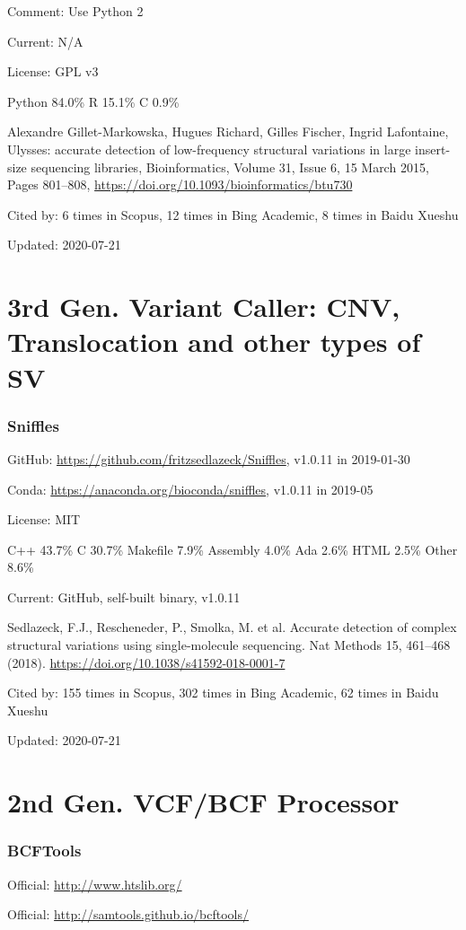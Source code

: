 \documentclass[]{article}
\newcommand{\cb}[3]{\par Cited by: {\color{blue}\Huge #1} times in Scopus, {\color{blue}\Huge #2} times in Bing Academic, {\color{blue}\Huge #3} times in Baidu Xueshu}
\begin{document}
Comment: Use Python 2

Current: N/A

License: GPL v3

Python 84.0\% R 15.1\% C 0.9\%

Alexandre Gillet-Markowska, Hugues Richard, Gilles Fischer, Ingrid Lafontaine, Ulysses: accurate detection of low-frequency structural variations in large insert-size sequencing libraries, Bioinformatics, Volume 31, Issue 6, 15 March 2015, Pages 801–808, \url{https://doi.org/10.1093/bioinformatics/btu730}\cb{6}{12}{8}

Updated: 2020-07-21

\part{3rd Gen. Variant Caller: CNV, Translocation and other types of SV}

\section{Sniffles}

GitHub: \url{https://github.com/fritzsedlazeck/Sniffles}, v1.0.11 in 2019-01-30

Conda: \url{https://anaconda.org/bioconda/sniffles}, v1.0.11 in 2019-05

License: MIT

C++ 43.7\% C 30.7\% Makefile 7.9\% Assembly 4.0\% Ada 2.6\% HTML 2.5\% Other 8.6\%

Current: GitHub, self-built binary, v1.0.11

Sedlazeck, F.J., Rescheneder, P., Smolka, M. et al. Accurate detection of complex structural variations using single-molecule sequencing. Nat Methods 15, 461–468 (2018). \url{https://doi.org/10.1038/s41592-018-0001-7}\cb{155}{302}{62}

Updated: 2020-07-21

\part{2nd Gen. VCF/BCF Processor}

\section{BCFTools}

Official: \url{http://www.htslib.org/}

Official: \url{http://samtools.github.io/bcftools/}
\end{document}

